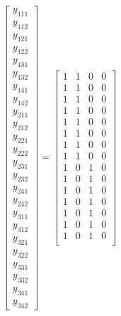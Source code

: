 \documentclass[paper=a4, fontsize=11pt]{scrartcl} %
\begin{document}
$$
\begin{bmatrix} 
y_{1 1 1} \\ y_{1 1 2}\\ 
y_{1 2 1} \\ y_{1 2 2} \\ 
y_{1 3 1} \\ y_{1 3 2} \\ 
y_{1 4 1} \\ y_{1 4 2} \\ 
y_{2 1 1} \\y_{2 1 2} \\ 
y_{2 2 1} \\ y_{2 2 2} \\
y_{2 3 1} \\ y_{2 3 2} \\ 
y_{2 4 1} \\ y_{2 4 2} \\ 
y_{3 1 1} \\y_{3 1 2} \\ 
y_{3 2 1} \\ y_{3 2 2} \\
y_{3 3 1} \\ y_{3 3 2} \\ 
y_{3 4 1} \\ y_{3 4 2} 
\end{bmatrix}
=
\begin{bmatrix} 1 & 1 & 0 & 0 \\
                             1 & 1 & 0 & 0 \\
                             1 & 1 & 0 & 0 \\
                             1 & 1 & 0 & 0 \\
                             1 & 1 & 0 & 0 \\
                             1 & 1 & 0 & 0 \\
                             1 & 1 & 0 & 0 \\
                             1 & 1 & 0 & 0 \\
                             1 & 0 & 1 & 0 \\
                             1 & 0 & 1 & 0 \\
                             1 & 0 & 1 & 0 \\
                             1 & 0 & 1 & 0 \\
                             1 & 0 & 1 & 0 \\
                             1 & 0 & 1 & 0 \\
                             1 & 0 & 1 & 0 \\

\end{bmatrix}$$
\end{document}

